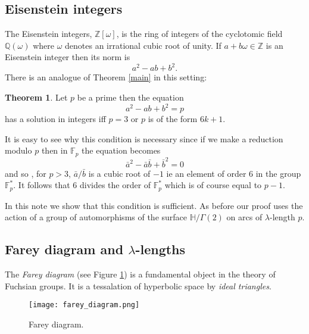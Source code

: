 \documentclass[12pt]{amsart}
\theoremstyle{plain}
\theoremstyle{definition}
\newtheorem{thm}{Theorem}[section]
\def\HH{\mathbb{H}}
\def\xx{\HH/g2}
\def\ZZ{\mathbb{Z}}
\def\QQ{\mathbb{Q}}
\def\fp{\mathbb{F}_p}
\def\g2{\Gamma(2)}
\def\xx{\HH/\g2}
\begin{document}
\subsection{Eisenstein integers}

The Eisenstein integers, $\ZZ[\omega]$,
is  the ring of integers of the cyclotomic field $\QQ(\omega)$
where $\omega$ denotes  an irrational cubic root of unity.
If $a + b\omega \in \ZZ$ is  an Eisenstein integer then its norm is
$$a^2 - ab  + b^2.$$
There is an analogue of Theorem \ref{main} in this setting:

\begin{thm}\label{eisenstein}
Let $p$ be a prime then the equation
\begin{equation}\label{eisenstein norm}
a^2 - ab + b^2 = p 
\end{equation}
has a solution in integers  iff  $p =3$ or $p$ is of the form $6k + 1$.
\end{thm}

It is easy to see why this condition is necessary since 
if we make a reduction modulo $p$ then  in $\fp$
the  equation  becomes
$$\bar{a}^2 -  \bar{a}\bar{b} +\bar{ b}^2 = 0$$
and so , for $p> 3$,  $\bar{a}/\bar{b}$ is a
cubic root of $-1$ ie an element of order 6 in the group 
$\fp^*$.
It follows that 6 divides 
the order of $\fp^*$  
which is of course equal to $p-1$.

In this note we show that this  condition is sufficient.
As before our  proof uses the action  
of a group of automorphisms of  the surface $\xx$ on
arcs of $\lambda$-length $p$.


\subsection{Farey diagram and $\lambda$-lengths}

The  \textit{Farey diagram} (see Figure \ref{farey diagram}) is a fundamental object in the theory of Fuchsian groups. It is a tessalation of hyperbolic space by \textit{ideal triangles}.

\begin{figure}[hb]
\begin{center}
\texttt{[image: farey\_diagram.png]} 
\end{center}
\caption{Farey diagram.}
\label{farey diagram}
\end{figure}
\end{document}
